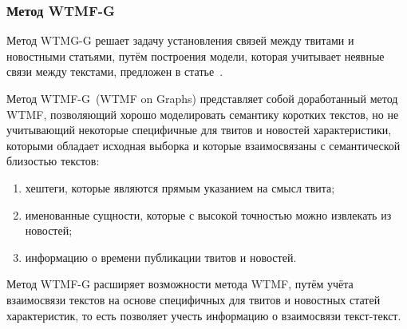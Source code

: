     \subsubsection{Метод WTMF-G}
    \label{subsubsec:wtmfg_review}
        Метод WTMG-G решает задачу установления связей между твитами и новостными статьями, путём построения модели, которая учитывает неявные связи между текстами,
         предложен в статье~\cite{linking_base}.

        Метод WTMF-G~(WTMF on Graphs) представляет собой доработанный метод WTMF, позволяющий хорошо моделировать семантику коротких текстов,
        но не учитывающий некоторые специфичные для твитов и новостей характеристики, которыми обладает исходная выборка и
        которые взаимосвязаны с семантической близостью текстов:
        \begin{enumerate}
            \item хештеги, которые являются прямым указанием на смысл твита;
            \item именованные сущности, которые с высокой точностью можно извлекать из новостей;
            \item информацию о времени публикации твитов и новостей.
        \end{enumerate}
        Метод WTMF-G расширяет возможности метода WTMF, путём учёта взаимосвязи текстов на основе специфичных для твитов и новостных статей характеристик,
        то есть позволяет учесть информацию о взаимосвязи текст-текст.

